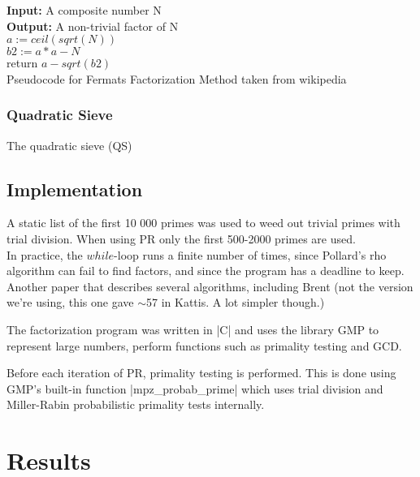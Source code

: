 \documentclass[paper=a4, fontsize=11pt,numbers=endperiod]{scrartcl} %
\numberwithin{equation}{section} %
\numberwithin{figure}{section} %
\numberwithin{table}{section} %
\begin{document}
\begin{algorithm}[H]
 \SetAlgoLined %
 \textbf{Input:} {A composite number N}\\
 \textbf{Output:} {A non-trivial factor of N}\\
 $a := ceil(sqrt(N))$\\
 $b2 := a*a - N$\\
  return $a-sqrt(b2)$\;
  \hspace{0pt}\\
  \caption{Pseudocode for Fermats Factorization Method taken from wikipedia}
\end{algorithm}

\subsubsection{Quadratic Sieve}
The quadratic sieve (QS) \cite{qsieve}

\subsection{Implementation}
A static list of the first 10 000 primes was used to weed out trivial primes with trial division. When using PR only the first 500-2000 primes are used.
\\
In practice, the $while$-loop runs a finite number of times, since Pollard's rho algorithm can fail to find factors, and since the program has a deadline to keep.
Another paper that describes several algorithms, including Brent (not the version we're using, this one gave $\sim$57 in Kattis. A lot simpler though.)\cite{otherpaper}

The factorization program was written in |C| and uses the library GMP\cite{gmp} to represent large numbers, perform functions such as primality testing and GCD.

Before each iteration of PR, primality testing is performed. This is done using GMP's built-in function |mpz_probab_prime| which uses trial division and Miller-Rabin probabilistic primality tests internally.\cite{probabprime}


\section{Results}
\end{document}

